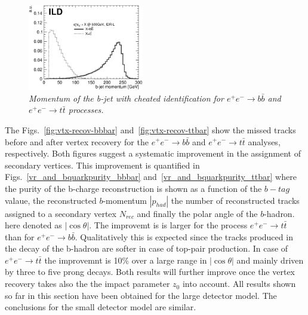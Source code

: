 \documentclass[preprint]{elsarticle}
\begin{document}
\begin{figure}
\centering
\includegraphics[width=0.45\textwidth]{figures_Methods/bjet_v2.eps}
\caption{\label{fig:control-bjet-mom} \sl Momentum of the b-jet with cheated identification for  $e^+e^-\rightarrow b\bar{b}$ and $e^+e^-\rightarrow t\bar{t}$ processes.}
\end{figure}



The Figs.~\ref{fig:vtx-recov-bbbar} and~\ref{fig:vtx-recov-ttbar} show the missed tracks before and after vertex recovery for the $e^+e^-\rightarrow b\bar{b}$ and $e^+e^-\rightarrow t\bar{t}$  analyses, respectively. Both figures suggest a systematic improvement in the assignment of secondary vertices. This improvement is quantified in Figs.~\ref{vr_and_bquarkpurity_bbbar} and~\ref{vr_and_bquarkpurity_ttbar} where the purity of the b-charge reconstruction is shown as a function of 
the $b-tag$ valaue,  the reconstructed $b$-momentum $|p_{had}|$ the number of reconstructed tracks assigned to a secondary vertex $N_{rec}$ and finally the polar angle of the $b$-hadron. here denoted as $|\cos \theta|$. The improvemt is is larger for the process $e^+e^-\rightarrow t\bar{t}$  than for $e^+e^-\rightarrow b\bar{b}$. Qualitatively this is expected since the tracks produced in the decay of the b-hadron are softer in case of top-pair production. In case of $e^+e^-\rightarrow t\bar{t}$ the improvemnt is 10\% over a large range in $|\cos \theta|$ and mainly driven by three to five prong decays.  Both results will further improve once the vertex recovery takes also the the impact parameter $z_0$ into account. All results shown so far in this section have been obtained for the large detector model. The conclusions for the small detector model are similar. 
\end{document}
